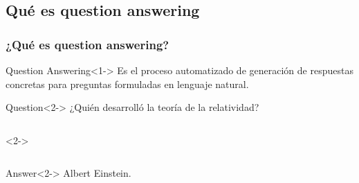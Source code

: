
\subsection{Qué es question answering}


\begin{frame}
  \frametitle{¿Qué es question answering?}
  \begin{block}{Question Answering}<1->
      Es el proceso automatizado de generación de respuestas concretas para preguntas formuladas en lenguaje natural.
  \end{block}
  \bigskip

 \begin{alertblock}{Question}<2->
      ¿Quién desarrolló la teoría de la relatividad?
  \end{alertblock}

  \begin{columns}<2->
      \begin{column}{.5\textwidth}
      \end{column}
      \begin{column}{.1\textwidth}
      \end{column}
      \begin{column}{.3\textwidth}
      \end{column}
      \begin{column}{.5\textwidth}

      \end{column}
  \end{columns}

  \begin{exampleblock}{Answer}<2->
      Albert Einstein.
  \end{exampleblock}
\end{frame}


